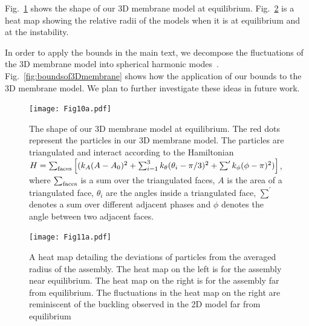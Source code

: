 \documentclass[amsmath,preprintnumbers,10pt,nofootinbib,prl,twocolumn]{revtex4-1}
\begin{document}
Fig.~\ref{fig:3Dmembranesurface} shows the shape of our 3D membrane model at equilibrium. Fig.~\ref{fig:relativeradius3D} is a heat map showing the relative radii of the models when it is at equilibrium and at the instability.

In order to apply the bounds in the main text, we decompose the fluctuations of the 3D membrane model into spherical harmonic modes~\cite{Safran1987}. Fig.~\ref{fig:boundsof3Dmembrane} shows how the application of our bounds to the 3D membrane model. We plan to further investigate these ideas in future work. 

\begin{figure}
\texttt{[image: Fig10a.pdf]}
\caption{ The shape of our 3D membrane model at equilibrium. The red dots represent the particles in our 3D membrane model. The particles are triangulated and interact according to the Hamiltonian $H=\sum_{\rm faces}\left[ (k_A(A-A_0)^2 +\sum_{i=1}^3 k_\theta (\theta_i-\pi/3)^2 + \sum^\prime k_\phi (\phi-\pi)^2)\right]$, where $\sum_{\rm faces}$ is a sum over the triangulated faces, $A$ is the area of a triangulated face, $\theta_i$ are the angles inside a triangulated face,  $\sum^\prime$ denotes a sum over different adjacent phases and $\phi$ denotes the angle between two adjacent faces.}
\label{fig:3Dmembranesurface}
\end{figure}
\begin{figure}
\texttt{[image: Fig11a.pdf]}
\caption{ A heat map detailing the deviations of particles from the averaged radius of the assembly. The heat map on the left is for the assembly near equilibrium. The heat map on the right is for the assembly far from equilibrium. The fluctuations in the heat map on the right are reminiscent of the buckling observed in the 2D model far from equilibrium}
\label{fig:relativeradius3D}
\end{figure}
\end{document}
